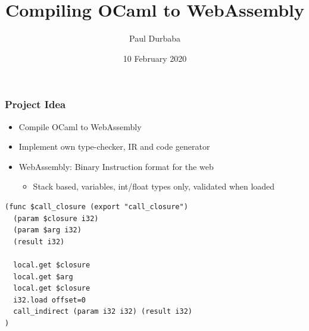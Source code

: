 \documentclass[12pt]{beamer}
\title{Compiling OCaml to WebAssembly}
\author{Paul Durbaba}
\date{10 February 2020}
\begin{document}
	\begin{frame}
		\titlepage
	\end{frame}

	\begin{frame}[fragile]
		\frametitle{Project Idea}
		\begin{itemize}
			\item Compile OCaml to WebAssembly
			\item Implement own type-checker, IR and code generator
			\item WebAssembly: Binary Instruction format for the web
				\begin{itemize}
					\item Stack based, variables, int/float types only, validated when loaded
				\end{itemize}
		\end{itemize}

		\begin{center}
		\begin{verbatim}
(func $call_closure (export "call_closure")
  (param $closure i32)
  (param $arg i32)
  (result i32)
  
  local.get $closure
  local.get $arg
  local.get $closure
  i32.load offset=0
  call_indirect (param i32 i32) (result i32)
)
		\end{verbatim}
		\end{center}
	\end{frame}
\end{document}
